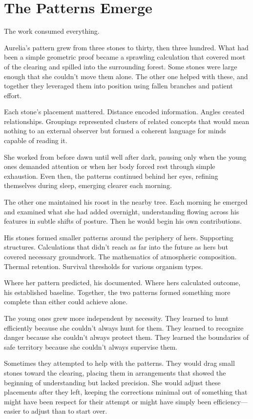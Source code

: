 \chapter{The Patterns Emerge}
\label{ch:05}


The work consumed everything.

Aurelia's pattern grew from three stones to thirty, then three hundred. What had been a simple geometric proof became a sprawling calculation that covered most of the clearing and spilled into the surrounding forest. Some stones were large enough that she couldn't move them alone. The other one helped with these, and together they leveraged them into position using fallen branches and patient effort.

Each stone's placement mattered. Distance encoded information. Angles created relationships. Groupings represented clusters of related concepts that would mean nothing to an external observer but formed a coherent language for minds capable of reading it.

She worked from before dawn until well after dark, pausing only when the young ones demanded attention or when her body forced rest through simple exhaustion. Even then, the patterns continued behind her eyes, refining themselves during sleep, emerging clearer each morning.

The other one maintained his roost in the nearby tree. Each morning he emerged and examined what she had added overnight, understanding flowing across his features in subtle shifts of posture. Then he would begin his own contributions.

His stones formed smaller patterns around the periphery of hers. Supporting structures. Calculations that didn't reach as far into the future as hers but covered necessary groundwork. The mathematics of atmospheric composition. Thermal retention. Survival thresholds for various organism types.

Where her pattern predicted, his documented. Where hers calculated outcome, his established baseline. Together, the two patterns formed something more complete than either could achieve alone.

The young ones grew more independent by necessity. They learned to hunt efficiently because she couldn't always hunt for them. They learned to recognize danger because she couldn't always protect them. They learned the boundaries of safe territory because she couldn't always supervise them.

Sometimes they attempted to help with the patterns. They would drag small stones toward the clearing, placing them in arrangements that showed the beginning of understanding but lacked precision. She would adjust these placements after they left, keeping the corrections minimal out of something that might have been respect for their attempt or might have simply been efficiency—easier to adjust than to start over.

